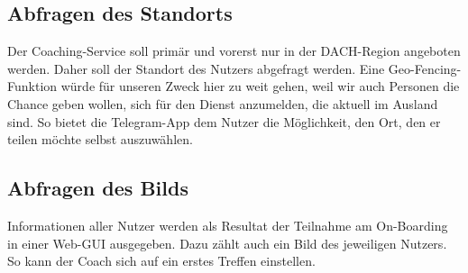         \subsection{Abfragen des Standorts}
            Der Coaching-Service soll primär und vorerst nur in der DACH-Region angeboten werden. Daher soll der Standort des Nutzers abgefragt werden. Eine Geo-Fencing-Funktion würde für unseren Zweck hier zu weit gehen, weil wir auch Personen die Chance geben wollen, sich für den Dienst anzumelden, die aktuell im Ausland sind. So bietet die Telegram-App dem Nutzer die Möglichkeit, den Ort, den er teilen möchte selbst auszuwählen.
        
        \subsection{Abfragen des Bilds}
            Informationen aller Nutzer werden als Resultat der Teilnahme am On-Boarding in einer Web-GUI ausgegeben. Dazu zählt auch ein Bild des jeweiligen Nutzers. So kann der Coach sich auf ein erstes Treffen einstellen. 
        
